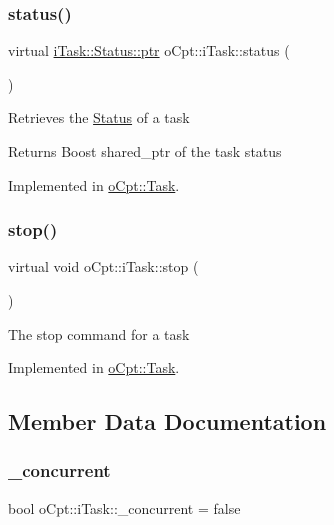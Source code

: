 \subsubsection{\texorpdfstring{status()}{status()}}
{\footnotesize\ttfamily virtual \hyperlink{classo_cpt_1_1i_task_1_1_status_aaf766c58d038e2defc3de2dddb92d1eb}{i\+Task\+::\+Status\+::ptr} o\+Cpt\+::i\+Task\+::status (\begin{DoxyParamCaption}{ }\end{DoxyParamCaption})\hspace{0.3cm}{\ttfamily [pure virtual]}}

Retrieves the \hyperlink{classo_cpt_1_1i_task_1_1_status}{Status} of a task \begin{DoxyReturn}{Returns}
Boost shared\+\_\+ptr of the task status 
\end{DoxyReturn}


Implemented in \hyperlink{classo_cpt_1_1_task_a724445e158919a4b5644d8eef9f7c754}{o\+Cpt\+::\+Task}.

\hypertarget{classo_cpt_1_1i_task_aedb88813b16914598dee9561813e56e8}{}\label{classo_cpt_1_1i_task_aedb88813b16914598dee9561813e56e8} 
\subsubsection{\texorpdfstring{stop()}{stop()}}
{\footnotesize\ttfamily virtual void o\+Cpt\+::i\+Task\+::stop (\begin{DoxyParamCaption}{ }\end{DoxyParamCaption})\hspace{0.3cm}{\ttfamily [pure virtual]}}

The stop command for a task 

Implemented in \hyperlink{classo_cpt_1_1_task_a62b4f1bbc1cf24434d2a2130162507f7}{o\+Cpt\+::\+Task}.



\subsection{Member Data Documentation}
\hypertarget{classo_cpt_1_1i_task_a1b6eaff4578d2ff18e70b07d00d7bb45}{}\label{classo_cpt_1_1i_task_a1b6eaff4578d2ff18e70b07d00d7bb45} 
\subsubsection{\texorpdfstring{\+\_\+concurrent}{\_concurrent}}
{\footnotesize\ttfamily bool o\+Cpt\+::i\+Task\+::\+\_\+concurrent = false\hspace{0.3cm}{\ttfamily [protected]}}



